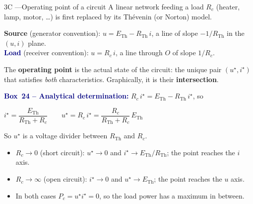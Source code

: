 \documentclass[10pt,a4paper]{article}
\newlength{\colw}
\newenvironment{column}{\begin{minipage}[t]{\colw}\vspace{0pt}}{\end{minipage}}
\newcommand{\ETh}{E_{\mathrm{Th}}}
\newcommand{\RTh}{R_{\mathrm{Th}}}
\newcommand{\ist}{i^{\star}}
\newcommand{\ust}{u^{\star}}
\newcommand{\bx}[2]{\textcolor{navy}{\textbf{Box~#1 -- #2}}}
\newcommand{\nxt}{\par\smallskip}
\begin{document}
\begin{column}
\begin{panel}{3C \enspace---\enspace Operating point of a circuit}
A linear network feeding a load $R_c$ (heater, lamp, motor, \dots) is first replaced by
its Thévenin (or Norton) model.
\par\smallskip
\begin{minipage}[c]{0.47\linewidth}\centering
{}
\end{minipage}\hfill
\begin{minipage}[c]{0.51\linewidth}
\textcolor{trapred}{\textbf{Source}} (generator convention): $u = \ETh - \RTh\, i$, a
line of slope $-1/\RTh$ in the $(u, i)$ plane.\\[3pt]
\textcolor{navy}{\textbf{Load}} (receiver convention): $u = R_c\, i$, a line through
$O$ of slope $1/R_c$.
\end{minipage}
\par\smallskip
The \textbf{operating point} is the actual state of the circuit: the unique pair
$(\ust, \ist)$ that satisfies \emph{both} characteristics. Graphically, it is their
\textbf{intersection}.
\nxt
\bx{24}{Analytical determination:} $R_c\,\ist = \ETh - \RTh\,\ist$, so
\begin{fml}
  $\ist = \dfrac{\ETh}{\RTh + R_c} \qquad
   \ust = R_c\,\ist = \dfrac{R_c}{\RTh + R_c}\,\ETh$
\end{fml}
So $\ust$ is a voltage divider between $\RTh$ and $R_c$.
\begin{itemize}
  \item $R_c \to 0$ (short circuit): $\ust \to 0$ and $\ist \to \ETh/\RTh$; the point
    reaches the $i$ axis.
  \item $R_c \to \infty$ (open circuit): $\ist \to 0$ and $\ust \to \ETh$; the point
    reaches the $u$ axis.
  \item In both cases $P_c = \ust\ist = 0$, so the load power has a maximum in between.

\end{itemize}
\end{panel}
\end{column}
\end{document}

